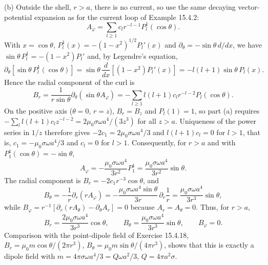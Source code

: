 (b) Outside the shell, $r>a$, there is no current, so use the same
decaying vector-potential expansion as for the current loop of
Example 15.4.2:
\[
A_\varphi=\sum_{l\ge1}c_lr^{-l-1}P_l^1(\cos\theta).
\]
With $x=\cos\theta$, $P_l^1(x)=-(1-x^2)^{1/2}P_l'(x)$ and
$\partial_\theta=-\sin\theta\,d/dx$, we have
$\sin\theta\,P_l^1=-(1-x^2)P_l'$ and, by Legendre's equation,
\[
\partial_\theta[\sin\theta\,P_l^1(\cos\theta)]
=\sin\theta\,\frac{d}{dx}[(1-x^2)P_l'(x)]
=-l(l+1)\sin\theta\,P_l(x).
\]
Hence the radial component of the curl is
\[
B_r=\frac1{r\sin\theta}\partial_\theta(\sin\theta A_\varphi)
=-\sum_{l\ge1}l(l+1)c_lr^{-l-2}P_l(\cos\theta).
\]
On the positive axis ($\theta=0$, $r=z$), $B_r=B_z$ and $P_l(1)=1$,
so part (a) requires
$-\sum_ll(l+1)c_lz^{-l-2}=2\mu_0\sigma\omega a^4/(3z^3)$ for all $z>a$.
Uniqueness of the power series in $1/z$ therefore gives
$-2c_1=2\mu_0\sigma\omega a^4/3$ and $l(l+1)c_l=0$ for $l>1$, that is,
$c_1=-\mu_0\sigma\omega a^4/3$ and $c_l=0$ for $l>1$. Consequently,
for $r>a$ and with $P_1^1(\cos\theta)=-\sin\theta$,
\[
\boxed{A_\varphi=-\frac{\mu_0\sigma\omega a^4}{3r^2}P_1^1
=\frac{\mu_0\sigma\omega a^4}{3r^2}\sin\theta}.
\]
The radial component is $B_r=-2c_1r^{-3}\cos\theta$, and
\[
B_\theta=-\frac1r\partial_r(rA_\varphi)
=-\frac{\mu_0\sigma\omega a^4\sin\theta}{3r}\,\partial_r\frac1r
=\frac{\mu_0\sigma\omega a^4}{3r^3}\sin\theta,
\]
while $B_\varphi=r^{-1}[\partial_r(rA_\theta)-\partial_\theta A_r]=0$
because $A_r=A_\theta=0$. Thus, for $r>a$,
\[
\boxed{B_r=\frac{2\mu_0\sigma\omega a^4}{3r^3}\cos\theta,\qquad
B_\theta=\frac{\mu_0\sigma\omega a^4}{3r^3}\sin\theta,\qquad B_\varphi=0}.
\]
Comparison with the point-dipole field of Exercise 15.4.18,
$B_r=\mu_0m\cos\theta/(2\pi r^3)$,
$B_\theta=\mu_0m\sin\theta/(4\pi r^3)$, shows that this is exactly a
dipole field with
$m=4\pi\sigma\omega a^4/3=Q\omega a^2/3$, $Q=4\pi a^2\sigma$.

